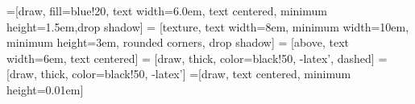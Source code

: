  
=[draw, fill=blue!20, text width=6.0em, text centered,
  minimum height=1.5em,drop shadow]
 = [texture, text width=8em, minimum width=10em,
  minimum height=3em, rounded corners, drop shadow]
 = [above, text width=6em, text centered]
 = [draw, thick, color=black!50, -latex', dashed]
 = [draw, thick, color=black!50, -latex']
=[draw, text centered, minimum height=0.01em]
 
\newcommand{\blockdist}{1.3}
\newcommand{\edgedist}{1.5}

\newcommand{\diagElt}[3]{node (p#1) [diagElt]
  {#2\\{\scriptsize\textit{#3}}}}

\newcommand{\background}[5]{%
  \begin{pgfonlayer}{background}
    \path (#1.west |- #2.north)+(-1,0.6) node (a1) {};
    \path (#3.east |- #4.south)+(+0.6,-0.3) node (a2) {};
    \path[fill=yellow!20,rounded corners, draw=black!50, dashed]
      (a1) rectangle (a2);
    \path (a1.east |- a1.south)+(1,-0.35) node (u1)[texto]
      {\scriptsize\textit{#5}};
  \end{pgfonlayer}}

\newcommand{\interOutput}[3]{%
  \path [linepart] (#1.east) -- node [above]
    {\scriptsize interOutput #2} (#3);}
